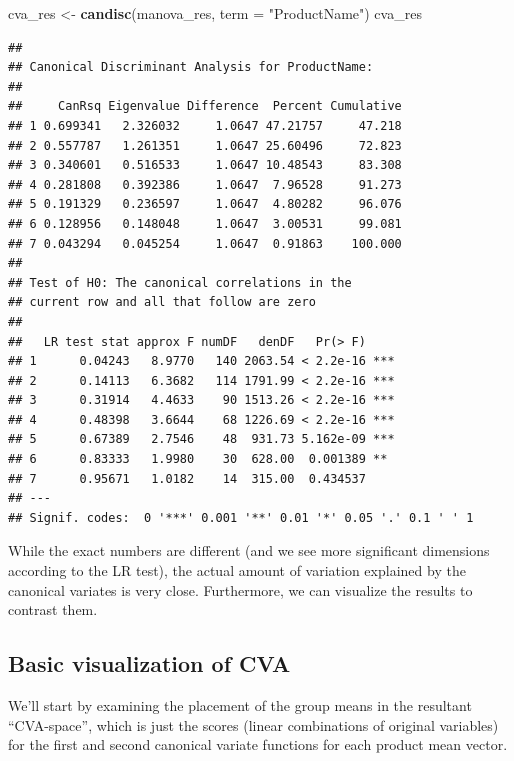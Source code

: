 \documentclass[
]{book}
\newenvironment{Shaded}{\begin{snugshade}}{\end{snugshade}}
\newcommand{\AttributeTok}[1]{\textcolor[rgb]{0.13,0.29,0.53}{#1}}
\newcommand{\FunctionTok}[1]{\textcolor[rgb]{0.13,0.29,0.53}{\textbf{#1}}}
\newcommand{\NormalTok}[1]{#1}
\newcommand{\OtherTok}[1]{\textcolor[rgb]{0.56,0.35,0.01}{#1}}
\newcommand{\StringTok}[1]{\textcolor[rgb]{0.31,0.60,0.02}{#1}}
\begin{document}
\begin{Shaded}
\begin{Highlighting}[]
\NormalTok{cva\_res }\OtherTok{\textless{}{-}} \FunctionTok{candisc}\NormalTok{(manova\_res, }\AttributeTok{term =} \StringTok{"ProductName"}\NormalTok{)}
\NormalTok{cva\_res}
\end{Highlighting}
\end{Shaded}

\begin{verbatim}
## 
## Canonical Discriminant Analysis for ProductName:
## 
##     CanRsq Eigenvalue Difference  Percent Cumulative
## 1 0.699341   2.326032     1.0647 47.21757     47.218
## 2 0.557787   1.261351     1.0647 25.60496     72.823
## 3 0.340601   0.516533     1.0647 10.48543     83.308
## 4 0.281808   0.392386     1.0647  7.96528     91.273
## 5 0.191329   0.236597     1.0647  4.80282     96.076
## 6 0.128956   0.148048     1.0647  3.00531     99.081
## 7 0.043294   0.045254     1.0647  0.91863    100.000
## 
## Test of H0: The canonical correlations in the 
## current row and all that follow are zero
## 
##   LR test stat approx F numDF   denDF   Pr(> F)    
## 1      0.04243   8.9770   140 2063.54 < 2.2e-16 ***
## 2      0.14113   6.3682   114 1791.99 < 2.2e-16 ***
## 3      0.31914   4.4633    90 1513.26 < 2.2e-16 ***
## 4      0.48398   3.6644    68 1226.69 < 2.2e-16 ***
## 5      0.67389   2.7546    48  931.73 5.162e-09 ***
## 6      0.83333   1.9980    30  628.00  0.001389 ** 
## 7      0.95671   1.0182    14  315.00  0.434537    
## ---
## Signif. codes:  0 '***' 0.001 '**' 0.01 '*' 0.05 '.' 0.1 ' ' 1
\end{verbatim}

While the exact numbers are different (and we see more significant dimensions according to the LR test), the actual amount of variation explained by the canonical variates is very close. Furthermore, we can visualize the results to contrast them.

\subsection{Basic visualization of CVA}\label{basic-visualization-of-cva}

We'll start by examining the placement of the group means in the resultant ``CVA-space'', which is just the scores (linear combinations of original variables) for the first and second canonical variate functions for each product mean vector.
\end{document}
